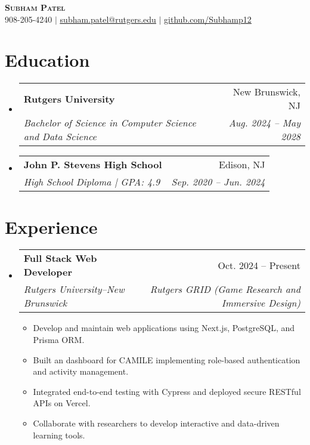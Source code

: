 \documentclass[letterpaper,11pt]{article}
\makeatletter
\newcommand{\resumeItem}[1]{
  \item\small{
    {#1 \vspace{-2pt}}
  }
}
\newcommand{\resumeSubheading}[4]{
  \vspace{-2pt}\item
    \begin{tabular*}{0.97\textwidth}[t]{l@{\extracolsep{\fill}}r}
      \textbf{#1} & #2 \\
      \textit{\small#3} & \textit{\small #4} \\
    \end{tabular*}\vspace{-7pt}
}
\newcommand{\resumeItemListStart}{\begin{itemize}}
\newcommand{\resumeItemListEnd}{\end{itemize}\vspace{-5pt}}
\makeatother
\begin{document}
\begin{center}
    \textbf{\Huge \scshape Subham Patel} \\ \vspace{1pt}
    \small 908-205-4240 $|$ \href{mailto:subham.patel@rutgers.edu}{\underline{subham.patel@rutgers.edu}} $|$ 
    \href{https://github.com/Subhamp12}{\underline{github.com/Subhamp12}}
\end{center}

\section{Education}
  \begin{itemize}[leftmargin=0.15in, label={}]
    \resumeSubheading
      {Rutgers University}{New Brunswick, NJ}
      {Bachelor of Science in Computer Science and Data Science}{Aug. 2024 -- May 2028}
    \resumeSubheading
      {John P. Stevens High School}{Edison, NJ}
      {High School Diploma | GPA: 4.9}{Sep. 2020 -- Jun. 2024}
  \end{itemize}

\section{Experience}
  \begin{itemize}[leftmargin=0.15in, label={}]
    \resumeSubheading
      {Full Stack Web Developer}{Oct. 2024 -- Present}
      {Rutgers University–New Brunswick}{Rutgers GRID (Game Research and Immersive Design)}
      \resumeItemListStart
        \resumeItem{Develop and maintain web applications using Next.js, PostgreSQL, and Prisma ORM.}
        \resumeItem{Built an dashboard for CAMILE implementing role-based authentication and activity management.}
        \resumeItem{Integrated end-to-end testing with Cypress and deployed secure RESTful APIs on Vercel.}
        \resumeItem{Collaborate with researchers to develop interactive and data-driven learning tools.}
      \resumeItemListEnd
  \end{itemize}


\end{document}
